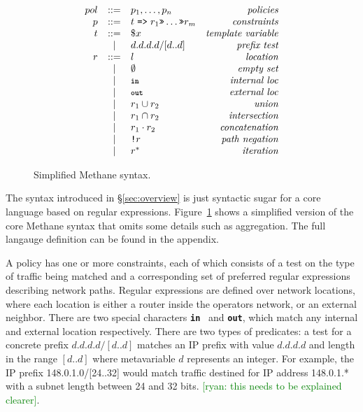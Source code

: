 \documentclass{sig-alternate-10pt}
\newcommand{\ryan}[1]{\textcolor{green}{[ryan: #1]}}
\newcommand{\sysname}{{\small \sf Methane}\xspace}
\newcommand{\KW}[1]{\texttt{\small\bfseries{#1}}}
\newcommand{\Prefer}{\texttt{>>}}
\newcommand{\Path}{\texttt{=>}}
\newcommand{\In}{\KW{in}}
\newcommand{\Out}{\KW{out}}
\newcommand{\NOT}{\texttt{!}}
\newcommand{\BNFALT}{\;\;|\;\;}
\begin{document}
\begin{figure}[t]\small
  \begin{minipage}[t]{\linewidth}
  \vspace*{-1\baselineskip}
  \[ \begin{array}{rclr}
     pol     &::=& p_1, \dots, p_n & \textit{policies} \\
     p       &::=& t \hspace{.3em} \Path \hspace{.3em} r_1 \Prefer \dots \Prefer r_m & \textit{constraints} \\
     t       &::=& \$x & \textit{template variable} \\
         &\BNFALT& d.d.d.d/[d..d] & \textit{prefix test} \\
     r       &::=& l & \textit{location} \\
         &\BNFALT& \emptyset & \textit{empty set} \\
         &\BNFALT& \In & \textit{internal loc} \\
         &\BNFALT& \Out & \textit{external loc} \\
         &\BNFALT& r_1 \cup r_2 & \textit{union} \\
         &\BNFALT& r_1 \cap r_2 & \textit{intersection} \\
         &\BNFALT& r_1 \cdot r_2 & \textit{concatenation} \\
         &\BNFALT& \NOT r & \textit{path negation} \\
         &\BNFALT& r^* & \textit{iteration} \\
  \end{array} \]%

  \end{minipage}
  \vspace{1em}
  \caption{Simplified \sysname syntax.}
  \label{fig:syntax}
\end{figure}%

The syntax introduced in \S\ref{sec:overview} is just syntactic sugar for a core language based on regular expressions. Figure~\ref{fig:syntax} shows a simplified version of the core \sysname syntax that omits some details such as aggregation. The full langauge definition can be found in the appendix.

A policy has one or more constraints, each of which consists of a test on the type of traffic being matched and a corresponding set of preferred regular expressions describing network paths. Regular expressions are defined over network locations, where each location is either a router inside the operators network, or an external neighbor. There are two special characters \In~ and \Out, which match any internal and external location respectively. There are two types of predicates: a test for a concrete prefix $d.d.d.d/[d..d]$ matches an IP prefix with value $d.d.d.d$ and length in the range $[d..d]$ where metavariable $d$ represents an integer. For example, the IP prefix 148.0.1.0/[24..32] would match traffic destined for IP address 148.0.1.* with a subnet length between 24 and 32 bits. \ryan{this needs to be explained clearer}.
\end{document}
